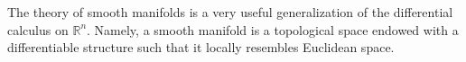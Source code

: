 The theory of smooth manifolds is a very useful generalization of the differential calculus on \(\mathbb{R}^n\). Namely, a smooth manifold is a topological space endowed with a differentiable structure such that it locally resembles Euclidean space.









